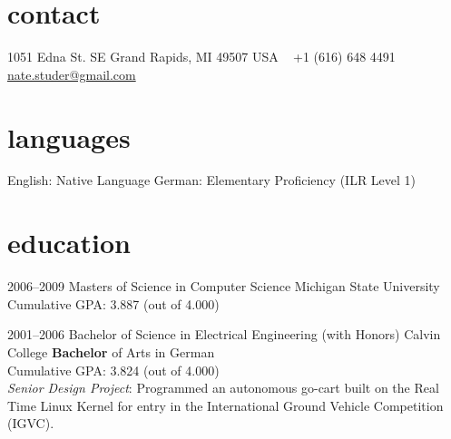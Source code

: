 \documentclass[print]{template/friggeri-cv} %
\begin{document}


\begin{aside} %
\section{contact}
1051 Edna St. SE
Grand Rapids, MI 49507
USA
~
+1 (616) 648 4491
~
\href{mailto:nate.studer@gmail.com}{nate.studer@gmail.com}
\section{languages}
English:  Native Language
German:  Elementary Proficiency (ILR Level 1)
\end{aside}


\section{education}

\begin{entrylist}

\entry
{2006--2009}
{Masters {\normalfont of Science in Computer Science}}
{Michigan State University}
{Cumulative GPA:  3.887 (out of 4.000)}

\entry
{2001--2006}
{Bachelor {\normalfont of Science in Electrical Engineering (with Honors)}}
{Calvin College}
{\textbf{Bachelor} of Arts in German \\
Cumulative GPA:  3.824 (out of 4.000) \\
\emph{Senior Design Project}: Programmed an autonomous go-cart built on the Real
Time Linux Kernel for entry in the International Ground Vehicle Competition (IGVC).}

\end{entrylist}
\end{document}
